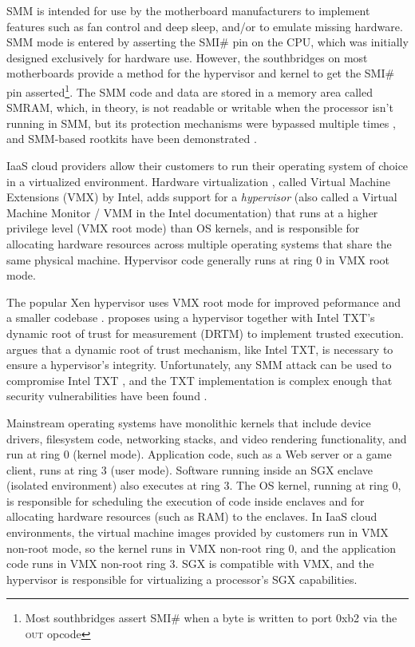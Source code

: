 SMM is intended for use by the motherboard manufacturers to implement features
such as fan control and deep sleep, and/or to emulate missing hardware. SMM
mode is entered by asserting the SMI\# pin on the CPU, which was initially
designed exclusively for hardware use. However, the southbridges on most
motherboards provide a method for the hypervisor and kernel to get the SMI\#
pin asserted\footnote{Most southbridges assert SMI\# when a byte is written to
port 0xb2 via the \textsc{out} opcode}. The SMM code and data are stored in a
memory area called SMRAM, which, in theory, is not readable or writable when
the processor isn't running in SMM, but its protection mechanisms were bypassed
multiple times \cite{duflot2006smm} \cite{rutkowska2008remap}
\cite{wojtczuk2009smm}, and SMM-based rootkits have been demonstrated
\cite{wecherowski2009smm} \cite{wecherowski2009smm}.

IaaS cloud providers allow their customers to run their operating system of
choice in a virtualized environment. Hardware virtualization
\cite{uhlig2005intel}, called Virtual Machine Extensions (VMX) by Intel,
adds support for a \textit{hypervisor} (also called a Virtual Machine Monitor
/ VMM in the Intel documentation) that runs at a higher privilege level
(VMX root mode) than OS kernels, and is responsible for allocating hardware
resources across multiple operating systems that share the same physical
machine. Hypervisor code generally runs at ring 0 in VMX root mode.

The popular Xen hypervisor uses VMX root mode for improved peformance and a
smaller codebase \cite{zhang2008xen}. \cite{mccune2010trustvisor} proposes
using a hypervisor together with Intel TXT's dynamic root of trust for
measurement (DRTM) to implement trusted execution.
\cite{vasudevan2010requirements} argues that a dynamic root of trust mechanism,
like Intel TXT, is necessary to ensure a hypervisor's integrity. Unfortunately,
any SMM attack can be used to compromise Intel TXT \cite{wojtczuk2009txt}, and
the TXT implementation is complex enough that security vulnerabilities have
been found \cite{wojtczuk2009txt2} \cite{wojtczuk2011txt}.

Mainstream operating systems have monolithic kernels that include device
drivers, filesystem code, networking stacks, and video rendering functionality,
and run at ring 0 (kernel mode). Application code, such as a Web server or
a game client, runs at ring 3 (user mode). Software running inside an SGX
enclave (isolated environment) also executes at ring 3. The OS kernel, running
at ring 0, is responsible for scheduling the execution of code inside enclaves
and for allocating hardware resources (such as RAM) to the enclaves. In IaaS
cloud environments, the virtual machine images provided by customers run in VMX
non-root mode, so the kernel runs in VMX non-root ring 0, and the application
code runs in VMX non-root ring 3. SGX is compatible with VMX, and the
hypervisor is responsible for virtualizing a processor's SGX capabilities.

